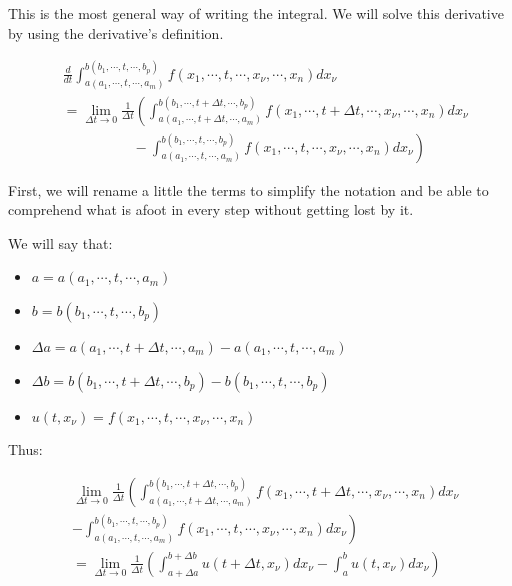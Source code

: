 \documentclass[12pt]{article}
\begin{document}
	This is the most general way of writing the integral. We will solve this derivative by using the derivative's definition.
	
	\[
		\begin{aligned}
			& \frac{d}{dt} \int_{a(a_1, \cdots, t, \cdots, a_m)}^{b(b_1, \cdots, t, \cdots, b_p)} f(x_1, \cdots, t, \cdots, x_\nu, \cdots, x_n) dx_\nu
			\\
			& = \lim_{\Delta t \to 0} \frac{1}{\Delta t} \left( \int_{a(a_1, \cdots, t + \Delta t, \cdots, a_m)}^{b(b_1, \cdots, t + \Delta t, \cdots, b_p)} f(x_1, \cdots, t + \Delta t, \cdots, x_\nu, \cdots, x_n) dx_\nu \right.
			\\
			& \left. \hspace{5em} - \int_{a(a_1, \cdots, t, \cdots, a_m)}^{b(b_1, \cdots, t, \cdots, b_p)} f(x_1, \cdots, t, \cdots, x_\nu, \cdots, x_n) dx_\nu \right)
		\end{aligned}
	\]
	
	First, we will rename a little the terms to simplify the notation and be able to comprehend what is afoot in every step without getting lost by it.
	
	We will say that:

	\begin{itemize}
		\item $a = a(a_1, \cdots, t, \cdots, a_m)$
		\item $b = b(b_1, \cdots, t, \cdots, b_p)$
		\item $\Delta a = a(a_1, \cdots, t + \Delta t, \cdots, a_m) - a(a_1, \cdots, t, \cdots, a_m)$
		\item $\Delta b = b(b_1, \cdots, t + \Delta t, \cdots, b_p) - b(b_1, \cdots, t, \cdots, b_p)$
		\item $u(t, x_\nu) =  f(x_1, \cdots, t, \cdots, x_\nu, \cdots, x_n)$
	\end{itemize}
	
	Thus:
	
	\[
		\begin{aligned}
			& \lim_{\Delta t \to 0} \frac{1}{\Delta t} \left( \int_{a(a_1, \cdots, t + \Delta t, \cdots, a_m)}^{b(b_1, \cdots, t + \Delta t, \cdots, b_p)} f(x_1, \cdots, t + \Delta t, \cdots, x_\nu, \cdots, x_n) dx_\nu \right.
			\\
			& \left. - \int_{a(a_1, \cdots, t, \cdots, a_m)}^{b(b_1, \cdots, t, \cdots, b_p)} f(x_1, \cdots, t, \cdots, x_\nu, \cdots, x_n) dx_\nu \right)
			\\
			& = \lim_{\Delta t \to 0} \frac{1}{\Delta t} \left( \int_{a + \Delta a}^{b + \Delta b} u(t + \Delta t, x_\nu) dx_\nu - \int_a^b u(t, x_\nu) dx_\nu \right) 
		\end{aligned}
	\]
	
\end{document}
